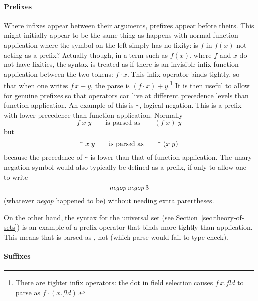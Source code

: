 \paragraph{Prefixes}

Where infixes appear between their arguments, prefixes appear before theirs.
This might initially appear to be the same thing as happens with normal function application where the symbol on the left simply has no fixity: is $f$ in $f(x)$ not acting as a prefix?
Actually though, in a term such as $f(x)$, where $f$ and $x$ do not have fixities, the syntax is treated as if there is an invisible infix function application between the two tokens: $f\cdot{}x$.
This infix operator binds tightly, so that when one writes $f\,x + y$, the parse is $(f\cdot{}x) + y$.\footnote{There are tighter infix operators: the dot in field selection causes $f\,x.fld$ to parse as $f\cdot(x.fld)$.}
It is then useful to allow for genuine prefixes so that operators can live at different precedence levels than function application.
An example of this is \verb+~+, logical negation.
This is a prefix with lower precedence than function application.
Normally
\[
   f\;x\; y\qquad \mbox{is parsed as}\qquad (f\; x)\; y
\] but \[
  \holtxt{\~{}}\; x\; y\qquad\mbox{is parsed as}\qquad
  \holtxt{\~{}}\; (x\; y)
\]
because the precedence of \verb+~+ is lower than that of function application.
The unary negation symbol would also typically be defined as a prefix, if only to allow one to write \[
  {\it negop}\,{\it negop}\,3
\]
(whatever {\it negop} happened to be) without needing extra parentheses.

On the other hand, the  syntax for the universal set (see Section~\ref{sec:theory-of-sets}) is an example of a prefix operator that binds more tightly than application.
This means that  is parsed as , not  (which parse would fail to type-check).

\paragraph{Suffixes}

